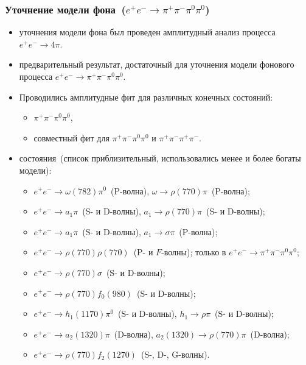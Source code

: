 \documentclass{beamer}
\begin{document}
\begin{frame}
  \frametitle{Уточнение модели фона~($e^+e^-\to\pi^+\pi^-\pi^0\pi^0$)}
  \begin{itemize}
    \item{ уточнения модели фона был проведен амплитудный анализ процесса
        $e^+e^-\to{4\pi}$. }
      \item{ предварительный результат, достаточный для уточнения
      модели фонового процесса $e^+e^-\to\pi^+\pi^-\pi^0\pi^0$.}
    \item{\scriptsize Проводились амплитудные фит для различных конечных состояний:}
      \begin{itemize}
      \item{\scriptsize $\pi^+\pi^-\pi^0\pi^0$,}
      \item{\scriptsize совместный фит для $\pi^+\pi^-\pi^0\pi^0$ и $\pi^+\pi^-\pi^+\pi^-$.}
      \end{itemize}
    \item{ состояния~(список приблизительный, использовались
        менее и более богаты модели):}
      \begin{itemize}
      \item{\scriptsize$e^+e^-\to\omega(782)\pi^0$~(P-волна), $\omega\to\rho(770)\pi$~(P-волна); %
        }
        \item{\scriptsize$e^+e^-\to{a}_1\pi$~(S- и D-волны), ${a}_1\to\rho(770)\pi$~(S- и D-волны);}
        \item{\scriptsize$e^+e^-\to{a}_1\pi$~(S- и D-волны), ${a}_1\to\sigma\pi$~(P-волна);}
        \item{\scriptsize$e^+e^-\to\rho(770)\rho(770)$~(P- и $F$-волны); только в $e^+e^-\to\pi^+\pi^-\pi^0\pi^0$;}
        \item{\scriptsize$e^+e^-\to\rho(770)\sigma$~(S- и D-волны);}
      \item{\scriptsize$e^+e^-\to\rho(770)f_0(980)$~(S- и D-волны);}
      \item{\scriptsize$e^+e^-\to{h}_1(1170)\pi^0$~(S- и D-волны), ${h}_1\to\rho\pi$~(S- и
          D-волны); %
        }
      \item{\scriptsize$e^+e^-\to{a}_2(1320)\pi$~(D-волна), ${a}_2(1320)\to\rho(770)\pi$~(D-волна);}
      \item{\scriptsize$e^+e^-\to\rho(770)f_2(1270)$~(S-, D-, G-волны).}
      \end{itemize}
  \end{itemize}
\end{frame}
\end{document}
